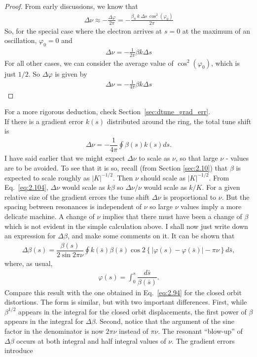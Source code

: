 \begin{proof}
	From early discussions, we know that
	\begin{align*}
		\Delta \nu \approx - \frac{\Delta \varphi}{2\pi} = -\frac{\beta_n\ k\ \Delta s\ \cos^2(\varphi_0)}{2\pi}
	\end{align*}
    So, for the special case where the electron arrives at $s=0$ at the maximum of an oscillation, $\varphi_0=0$ and
    \begin{align*}
		\Delta \nu = -\frac{1}{2\pi}\beta k \Delta s
	\end{align*}
    For all other cases, we can consider the average value of $\cos^2(\varphi_0)$, which is just $1/2$. So $\Delta \varphi$ is given by
	\begin{align*}
		\Delta \nu = -\frac{1}{4\pi}\beta k \Delta s
	\end{align*}
\end{proof}
For a more rigorous deduction, check Section~\ref{sec:dtune_grad_err}.\\
If there is a gradient error $k(s)$ distributed around the ring, the total tune shift is
\begin{align}\label{eq:2.104}
	\Delta\nu = -\dfrac{1}{4\pi}\oint \beta(s) k(s) ds.
\end{align}
I have said earlier that we might expect $\Delta\nu$ to scale as $\nu$, so that large $\nu$ -
values are to be avoided. To see that it is so, recall (from Section \ref{sec:2.10}) that $\beta$ is expected to scale roughly as $|K|^{-1/2}$. Then $\nu$ should scale as $|K|^{-1/2}$. From Eq.~\eqref{eq:2.104}, $\Delta\nu$ would scale as $k\beta$ so $\Delta\nu/\nu$ would scale as $k/K$. For a given relative size of the gradient errors the tune shift $\Delta\nu$ is proportional to $\nu$. But the spacing between resonances is independent of $\nu$ so large $\nu$ values imply a more delicate machine.
A change of $\nu$ implies that there must have been a change of $\beta$ which is not evident in the simple calculation above. I shall now just write down an expression for $\Delta\beta$, and make some comments on it. It can be shown that
\begin{align}\label{eq:2.105}
	\boxed{\Delta\beta(s) = \dfrac{\beta(s)}{2\sin2\pi\nu}\oint k(\bar{s})\beta(\bar{s})\cos2\left\lbrace |\varphi(s) - \varphi(\bar{s})| - \pi\nu \right\rbrace d\bar{s}},
\end{align}
where, as usual,
\begin{align*}
	\varphi(s) = \int_0^s\dfrac{d\bar{s}}{\beta(\bar{s})}.
\end{align*}
Compare this result with the one obtained in Eq.~\eqref{eq:2.94} for the closed orbit distortions. The form is similar, but with two important differences.  First, while $\beta^{1/2}$ appears in the integral for the closed orbit displacements, the first power of $\beta$ appears in the integral for $\Delta\beta$. Second, notice that the argument of the sine factor in the denominator is now $2\pi\nu$ instead of $\pi\nu$. The resonant “blow-up” of $\Delta\beta$ occurs at both integral and half integral values of $\nu$. The gradient errors introduce
